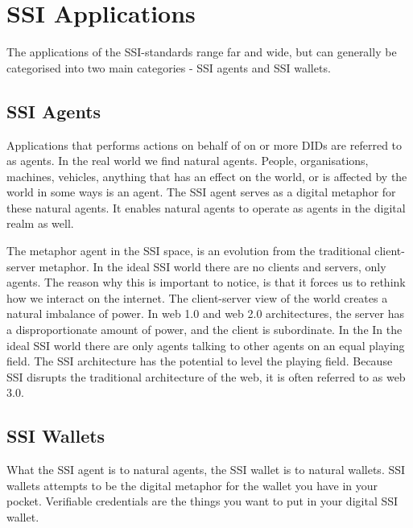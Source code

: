 \pagebreak



\hypertarget{ssi-applications}{%
\section{SSI Applications}\label{ssi-applications}}

The applications of the SSI-standards range far and wide, but can
generally be categorised into two main categories - SSI agents and SSI
wallets.

\hypertarget{ssi-agents}{%
\subsection{SSI Agents}\label{ssi-agents}}

Applications that performs actions on behalf of on or more DIDs are
referred to as agents. In the real world we find natural agents. People,
organisations, machines, vehicles, anything that has an effect on the
world, or is affected by the world in some ways is an agent. The SSI
agent serves as a digital metaphor for these natural agents. It enables
natural agents to operate as agents in the digital realm as well.

The metaphor agent in the SSI space, is an evolution from the
traditional client-server metaphor. In the ideal SSI world there are no
clients and servers, only agents. The reason why this is important to
notice, is that it forces us to rethink how we interact on the internet.
The client-server view of the world creates a natural imbalance of
power. In web 1.0 and web 2.0 architectures, the server has a
disproportionate amount of power, and the client is subordinate. In the
In the ideal SSI world there are only agents talking to other agents on
an equal playing field. The SSI architecture has the potential to level
the playing field. Because SSI disrupts the traditional architecture of
the web, it is often referred to as web 3.0.

\hypertarget{ssi-wallets}{%
\subsection{SSI Wallets}\label{ssi-wallets}}

What the SSI agent is to natural agents, the SSI wallet is to natural
wallets. SSI wallets attempts to be the digital metaphor for the wallet
you have in your pocket. Verifiable credentials are the things you want
to put in your digital SSI wallet.

